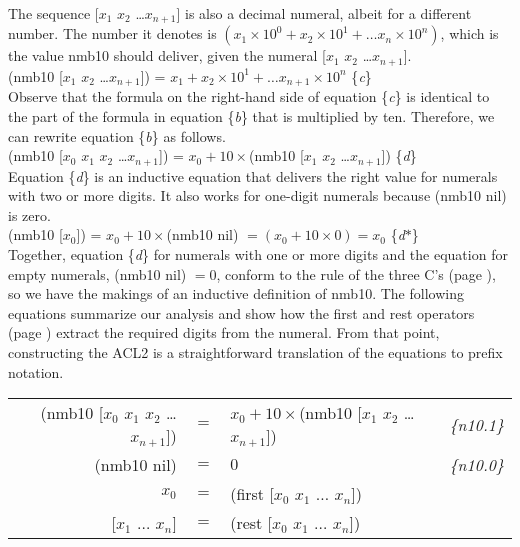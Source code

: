 The sequence [$x_1$ $x_2$ \dots $x_{n+1}$] is also a decimal numeral,
albeit for a different number.
The number it denotes is
$(x_1 \times 10^0 + x_2 \times 10^1 + \dots x_n \times 10^n)$,
which is the value nmb10 should deliver, given the numeral [$x_1$ $x_2$ \dots $x_{n+1}$].\\
\hspace*{1cm}
(nmb10 [$x_1$ $x_2$ \dots $x_{n+1}$]) = $x_1 + x_2 \times 10^1 + \dots x_{n+1} \times 10^n$ \hfill \{\emph{c}\}\\

Observe that the formula on the right-hand side of equation \{\emph{c}\}
is identical
to the part of the formula in equation \{\emph{b}\} that is multiplied by ten.
Therefore, we can rewrite equation \{\emph{b}\} as follows.\\
\hspace*{1cm}
(nmb10 [$x_0$ $x_1$ $x_2$ \dots $x_{n+1}$]) = $x_0 + 10 \times$(nmb10 [$x_1$ $x_2$ \dots $x_{n+1}$]) \hfill \{\emph{d}\}\\

Equation \{\emph{d}\} is an inductive equation that delivers the right value for
numerals with two or more digits. It also works
for one-digit numerals because (nmb10 nil) is zero.\\
\hspace*{1cm}
(nmb10 [$x_0$]) = $x_0 + 10 \times$(nmb10 nil) $ = (x_0 + 10 \times 0) = x_0$ \hfill \{\emph{d}$*$\}\\

Together, equation \{\emph{d}\} for numerals with one or more digits
and the equation for empty numerals, (nmb10 nil) $= 0$, conform to the
rule of the three C's (page \pageref{fig:inductive-def-keys}),
so we have the makings of an inductive definition of nmb10.
The following equations summarize our analysis and show how
the first and rest operators
(page \pageref{first-rest-cons})
extract the required digits from the numeral.
From that point, constructing the ACL2
is a straightforward translation of the equations to prefix notation.

\begin{center}
\begin{tabular}{rlll}
(nmb10 [$x_0$ $x_1$ $x_2$ \dots $x_{n+1}$]) & $=$ &$x_0 + 10\times$(nmb10 [$x_1$ $x_2$ \dots $x_{n+1}$]) &\emph{\{n10.1\}}\\
(nmb10 nil)                           & $=$ &$0$   &\emph{\{n10.0\}}\\
$x_0$                         & $=$ &(first [$x_0$ $x_1$ $\dots$ $x_n$]) &\\
{[$x_1$ $\dots$ $x_n$]}       & $=$ &(rest  [$x_0$ $x_1$ $\dots$ $x_n$]) &\\ %
\end{tabular}
\end{center}

